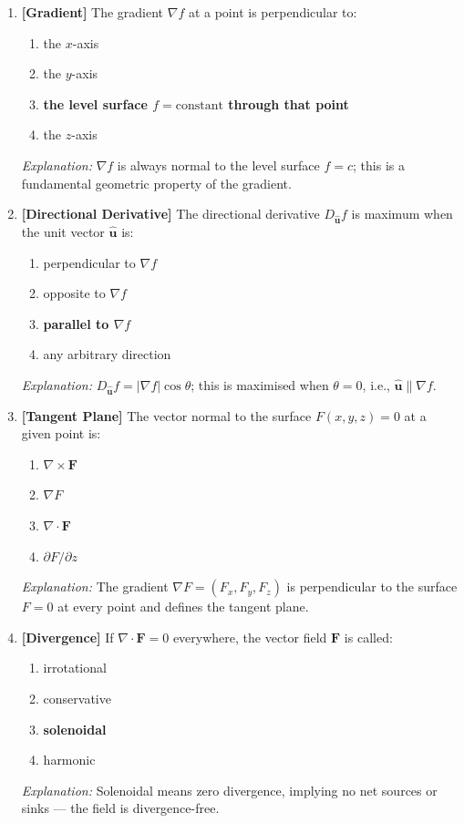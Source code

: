 \documentclass[12pt,a4paper]{article}
\begin{document}
\begin{enumerate}[leftmargin=*, label=\textbf{MCQ \arabic*.}]
  \item \textbf{[Gradient]} The gradient $\nabla f$ at a point is perpendicular to:
  \begin{enumerate}[label=(\alph*)]
    \item the $x$-axis
    \item the $y$-axis
    \item \textbf{the level surface $f = \text{constant}$ through that point}
    \item the $z$-axis
  \end{enumerate}
  \textit{Explanation:} $\nabla f$ is always normal to the level surface $f = c$; this is a fundamental geometric property of the gradient.

  \item \textbf{[Directional Derivative]} The directional derivative $D_{\hat{\mathbf{u}}} f$ is maximum when the unit vector $\hat{\mathbf{u}}$ is:
  \begin{enumerate}[label=(\alph*)]
    \item perpendicular to $\nabla f$
    \item opposite to $\nabla f$
    \item \textbf{parallel to $\nabla f$}
    \item any arbitrary direction
  \end{enumerate}
  \textit{Explanation:} $D_{\hat{\mathbf{u}}} f = |\nabla f|\cos\theta$; this is maximised when $\theta = 0$, i.e., $\hat{\mathbf{u}} \parallel \nabla f$.

  \item \textbf{[Tangent Plane]} The vector normal to the surface $F(x,y,z) = 0$ at a given point is:
  \begin{enumerate}[label=(\alph*)]
    \item $\nabla \times \mathbf{F}$
    \item \textbf{$\nabla F$}
    \item $\nabla \cdot \mathbf{F}$
    \item $\partial F/\partial z$
  \end{enumerate}
  \textit{Explanation:} The gradient $\nabla F = (F_x, F_y, F_z)$ is perpendicular to the surface $F = 0$ at every point and defines the tangent plane.

  \item \textbf{[Divergence]} If $\nabla \cdot \mathbf{F} = 0$ everywhere, the vector field $\mathbf{F}$ is called:
  \begin{enumerate}[label=(\alph*)]
    \item irrotational
    \item conservative
    \item \textbf{solenoidal}
    \item harmonic
  \end{enumerate}
  \textit{Explanation:} Solenoidal means zero divergence, implying no net sources or sinks --- the field is divergence-free.


\end{enumerate}
\end{document}
